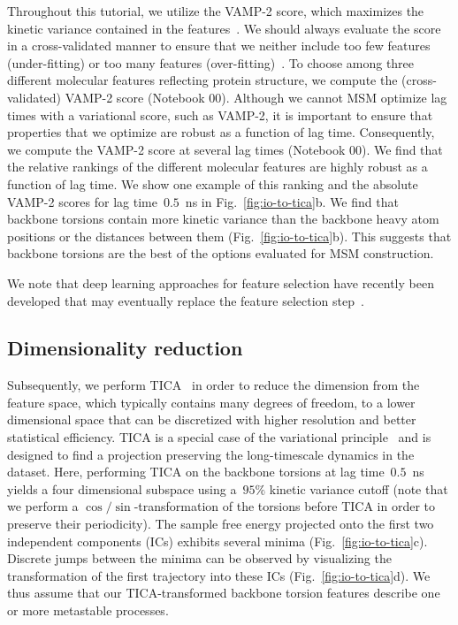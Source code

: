 \documentclass[9pt,tutorial]{livecoms}
\begin{document}
Throughout this tutorial, we utilize the VAMP-2 score, which maximizes the kinetic variance contained in the features~\cite{kinetic-maps}.
We should always evaluate the score in a cross-validated manner to ensure that we neither include too few features (under-fitting) or too many features (over-fitting)~\cite{gmrq,vamp-preprint}.
To choose among three different molecular features reflecting protein structure,
we compute the (cross-validated) VAMP-2 score (Notebook 00).
Although we cannot MSM optimize lag times with a variational score\cite{husic2017note}, such as VAMP-2,
it is important to ensure that properties that we optimize are robust as a function of lag time. 
Consequently, we compute the VAMP-2 score at several lag times (Notebook 00). 
We find that the relative rankings of the different molecular features are highly robust as a function of lag time. 
We show one example of this ranking and the absolute VAMP-2 scores for lag time~$0.5$~ns in Fig.~\ref{fig:io-to-tica}b. 
We find that backbone torsions contain more kinetic variance than the backbone heavy atom positions or the distances between them (Fig.~\ref{fig:io-to-tica}b).
This suggests that backbone torsions are the best of the options evaluated for MSM construction.

We note that deep learning approaches for feature selection have recently been developed that may eventually replace the feature selection step~\cite{vampnet,tae,hernandez-vde}.

\subsection{Dimensionality reduction}

Subsequently, we perform TICA~\cite{tica,kinetic-maps} in order to reduce the dimension from the feature space,
which typically contains many degrees of freedom,
to a lower dimensional space that can be discretized with higher resolution and better statistical efficiency.
TICA is a special case of the variational principle~\cite{noe-vac,nueske-vamk} and is designed to find a projection preserving the long-timescale dynamics in the dataset.
Here, performing TICA on the backbone torsions at lag time~$0.5$~ns yields a four dimensional subspace using a~$95\%$ kinetic variance cutoff
(note that we perform a $\cos/\sin$-transformation of the torsions before TICA in order to preserve their periodicity).
The sample free energy projected onto the first two independent components (ICs) exhibits several minima (Fig.~\ref{fig:io-to-tica}c).
Discrete jumps between the minima can be observed by visualizing the transformation of the first trajectory into these ICs (Fig.~\ref{fig:io-to-tica}d).
We thus assume that our TICA-transformed backbone torsion features describe one or more metastable processes.
\end{document}
